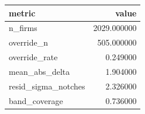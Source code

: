 \begin{tabular}{lr}
\toprule
metric & value \\
\midrule
n_firms & 2029.000000 \\
override_n & 505.000000 \\
override_rate & 0.249000 \\
mean_abs_delta & 1.904000 \\
resid_sigma_notches & 2.326000 \\
band_coverage & 0.736000 \\
\bottomrule
\end{tabular}
